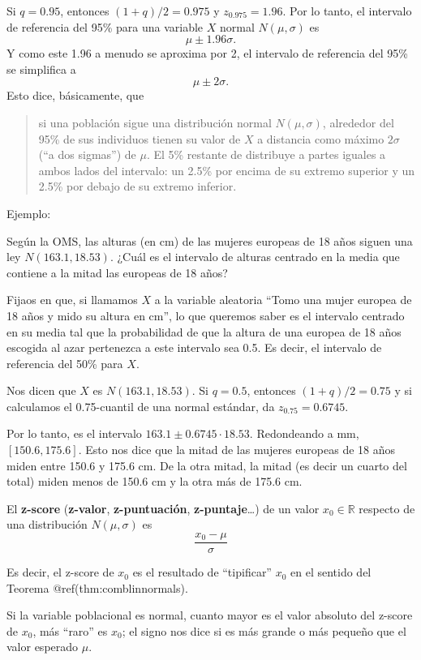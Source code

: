 \documentclass[
  spanish,
  letterpaper,
  DIV=11,
  numbers=noendperiod]{scrreprt}
\begin{document}
Si \(q=0.95\), entonces \((1+q)/2=0.975\) y \(z_{0.975}=1.96\). Por lo
tanto, el intervalo de referencia del 95\% para una variable \(X\)
normal \(N(\mu,\sigma)\) es \[
\mu\pm 1.96\sigma.
\] Y como este 1.96 a menudo se aproxima por 2, el intervalo de
referencia del 95\% se simplifica a \[
\mu\pm 2\sigma.
\] Esto dice, básicamente, que

\begin{quote}
si una población sigue una distribución normal \(N(\mu,\sigma)\),
alrededor del 95\% de sus individuos tienen su valor de \(X\) a
distancia como máximo \(2\sigma\) (``a dos sigmas'') de \(\mu\). El 5\%
restante de distribuye a partes iguales a ambos lados del intervalo: un
2.5\% por encima de su extremo superior y un 2.5\% por debajo de su
extremo inferior.
\end{quote}

Ejemplo:

Según la OMS, las alturas (en cm) de las mujeres europeas de 18 años
siguen una ley \(N(163.1,18.53)\). ¿Cuál es el intervalo de alturas
centrado en la media que contiene a la mitad las europeas de 18 años?

Fijaos en que, si llamamos \(X\) a la variable aleatoria ``Tomo una
mujer europea de 18 años y mido su altura en cm'', lo que queremos saber
es el intervalo centrado en su media tal que la probabilidad de que la
altura de una europea de 18 años escogida al azar pertenezca a este
intervalo sea 0.5. Es decir, el intervalo de referencia del 50\% para
\(X\).

Nos dicen que \(X\) es \(N(163.1,18.53)\). Si \(q=0.5\), entonces
\((1+q)/2=0.75\) y si calculamos el 0.75-cuantil de una normal estándar,
da \(z_{0.75}=0.6745\).

Por lo tanto, es el intervalo \(163.1\pm 0.6745\cdot 18.53\).
Redondeando a mm, \([150.6, 175.6]\). Esto nos dice que la mitad de las
mujeres europeas de 18 años miden entre 150.6 y 175.6 cm. De la otra
mitad, la mitad (es decir un cuarto del total) miden menos de 150.6 cm y
la otra más de 175.6 cm.

El \textbf{z-score} (\textbf{z-valor}, \textbf{z-puntuación},
\textbf{z-puntaje}\ldots) de un valor \(x_0\in \mathbb{R}\) respecto de
una distribución \(N(\mu,\sigma)\) es \[
\frac{x_0-\mu}{\sigma}
\]

Es decir, el z-score de \(x_0\) es el resultado de ``tipificar'' \(x_0\)
en el sentido del Teorema @ref(thm:comblinnormals).

Si la variable poblacional es normal, cuanto mayor es el valor absoluto
del z-score de \(x_0\), más ``raro'' es \(x_0\); el signo nos dice si es
más grande o más pequeño que el valor esperado \(\mu\).
\end{document}
